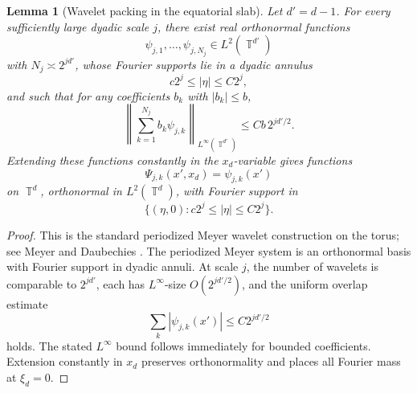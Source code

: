 \documentclass[12pt]{article}
\newtheorem{lemma}[theorem]{Lemma}
\theoremstyle{remark}
\DeclareMathOperator{\T}{\mathbb T}
\newcommand{\asym}{\asymp}
\begin{document}
\begin{lemma}[Wavelet packing in the equatorial slab]
\label{lem:wavelet-packing}
Let \(d'=d-1\). For every sufficiently large dyadic scale \(j\), there exist real orthonormal functions
\[
\psi_{j,1},\dots,\psi_{j,N_j}\in L^2(\T^{d'})
\]
with \(N_j\asym 2^{jd'}\), whose Fourier supports lie in a dyadic annulus
\[
c2^j\le |\eta|\le C2^j,
\]
and such that for any coefficients \(b_k\) with \(|b_k|\le b\),
\[
\left\|
\sum_{k=1}^{N_j}b_k\psi_{j,k}
\right\|_{L^\infty(\T^{d'})}
\le
C b\,2^{jd'/2}.
\]
Extending these functions constantly in the \(x_d\)-variable gives functions
\[
\Psi_{j,k}(x',x_d)=\psi_{j,k}(x')
\]
on \(\T^d\), orthonormal in \(L^2(\T^d)\), with Fourier support in
\[
\{(\eta,0): c2^j\le |\eta|\le C2^j\}.
\]
\end{lemma}
\begin{proof}
This is the standard periodized Meyer wavelet construction on the torus; see Meyer \cite[Chapter 3]{Meyer} and Daubechies \cite[Chapter 5]{Daubechies}. The periodized Meyer system is an orthonormal basis with Fourier support in dyadic annuli. At scale \(j\), the number of wavelets is comparable to \(2^{jd'}\), each has \(L^\infty\)-size \(O(2^{jd'/2})\), and the uniform overlap estimate
\[
\sum_k|\psi_{j,k}(x')|\le C2^{jd'/2}
\]
holds. The stated \(L^\infty\) bound follows immediately for bounded coefficients. Extension constantly in \(x_d\) preserves orthonormality and places all Fourier mass at \(\xi_d=0\).
\end{proof}
\end{document}
